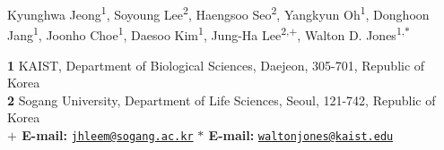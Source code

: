 Kyunghwa Jeong\textsuperscript{1},
Soyoung Lee\textsuperscript{2},
Haengsoo Seo\textsuperscript{2},
Yangkyun Oh\textsuperscript{1},
Donghoon Jang\textsuperscript{1},
Joonho Choe\textsuperscript{1},
Daesoo Kim\textsuperscript{1},
Jung-Ha Lee\textsuperscript{2,$+$},
Walton D. Jones\textsuperscript{1,$\ast$}

{\bf 1} KAIST, Department of Biological Sciences, Daejeon, 305-701, Republic of Korea
\\
{\bf 2} Sogang University, Department of Life Sciences, Seoul, 121-742, Republic of Korea
\\
{\bf $+$ E-mail:} \href{mailto:jhleem@sogang.ac.kr}{\nolinkurl{jhleem@sogang.ac.kr}}
{\bf $\ast$ E-mail:} \href{mailto:waltonjones@kaist.edu}{\nolinkurl{waltonjones@kaist.edu}}
